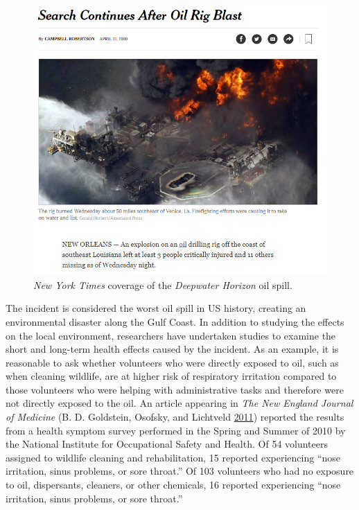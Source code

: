\documentclass[]{book}
\theoremstyle{definition}
\theoremstyle{definition}
\theoremstyle{definition}
\theoremstyle{remark}
\begin{document}
\begin{figure}

{\centering \includegraphics[width=0.8\linewidth]{./images/Case-Deepwater-NYTclip} 

}

\caption{\emph{New York Times} coverage of the
\emph{Deepwater Horizon} oil spill.}\label{fig:casedeepwater-nytclip}
\end{figure}

The incident is considered the worst oil spill in US history, creating
an environmental disaster along the Gulf Coast. In addition to studying
the effects on the local environment, researchers have undertaken
studies to examine the short and long-term health effects caused by the
incident. As an example, it is reasonable to ask whether volunteers who
were directly exposed to oil, such as when cleaning wildlife, are at
higher risk of respiratory irritation compared to those volunteers who
were helping with administrative tasks and therefore were not directly
exposed to the oil. An article appearing in \emph{The New England
Journal of Medicine} (B. D. Goldstein, Osofsky, and Lichtveld
\protect\hyperlink{ref-Goldstein2011}{2011}) reported the results from a
health symptom survey performed in the Spring and Summer of 2010 by the
National Institute for Occupational Safety and Health. Of 54 volunteers
assigned to wildlife cleaning and rehabilitation, 15 reported
experiencing ``nose irritation, sinus problems, or sore throat.'' Of 103
volunteers who had no exposure to oil, dispersants, cleaners, or other
chemicals, 16 reported experiencing ``nose irritation, sinus problems,
or sore throat.''
\end{document}
